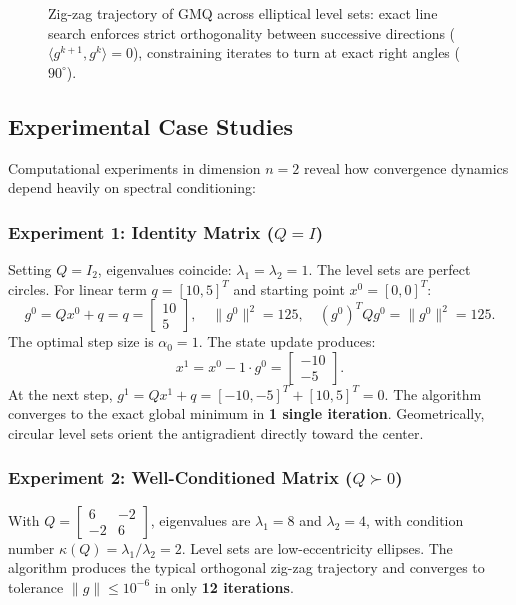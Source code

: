 \begin{figure}[H]
{%
}
\caption{Zig-zag trajectory of GMQ across elliptical level sets: exact line search enforces strict orthogonality between successive directions ($\langle g^{k+1}, g^k \rangle = 0$), constraining iterates to turn at exact right angles ($90^\circ$).}
\label{fig:zig-zag-gmq-en}
\end{figure}

\subsection{Experimental Case Studies}
Computational experiments in dimension $n = 2$ reveal how convergence dynamics depend heavily on spectral conditioning:

\subsubsection{Experiment 1: Identity Matrix ($Q = I$)}
Setting $Q = I_2$, eigenvalues coincide: $\lambda_1 = \lambda_2 = 1$. The level sets are perfect circles.
For linear term $q = [10, 5]^T$ and starting point $x^0 = [0, 0]^T$:
\begin{equation}
    g^0 = Q x^0 + q = q = \begin{bmatrix} 10 \\ 5 \end{bmatrix}, \quad \|g^0\|^2 = 125, \quad (g^0)^T Q g^0 = \|g^0\|^2 = 125.
\end{equation}
The optimal step size is $\alpha_0 = 1$. The state update produces:
\begin{equation}
    x^1 = x^0 - 1 \cdot g^0 = \begin{bmatrix} -10 \\ -5 \end{bmatrix}.
\end{equation}
At the next step, $g^1 = Q x^1 + q = [-10, -5]^T + [10, 5]^T = 0$.
The algorithm converges to the exact global minimum in \textbf{1 single iteration}. Geometrically, circular level sets orient the antigradient directly toward the center.

\subsubsection{Experiment 2: Well-Conditioned Matrix ($Q \succ 0$)}
With $Q = \begin{bmatrix} 6 & -2 \\ -2 & 6 \end{bmatrix}$, eigenvalues are $\lambda_1 = 8$ and $\lambda_2 = 4$, with condition number $\kappa(Q) = \lambda_1 / \lambda_2 = 2$.
Level sets are low-eccentricity ellipses. The algorithm produces the typical orthogonal zig-zag trajectory and converges to tolerance $\|g\| \le 10^{-6}$ in only \textbf{12 iterations}.

